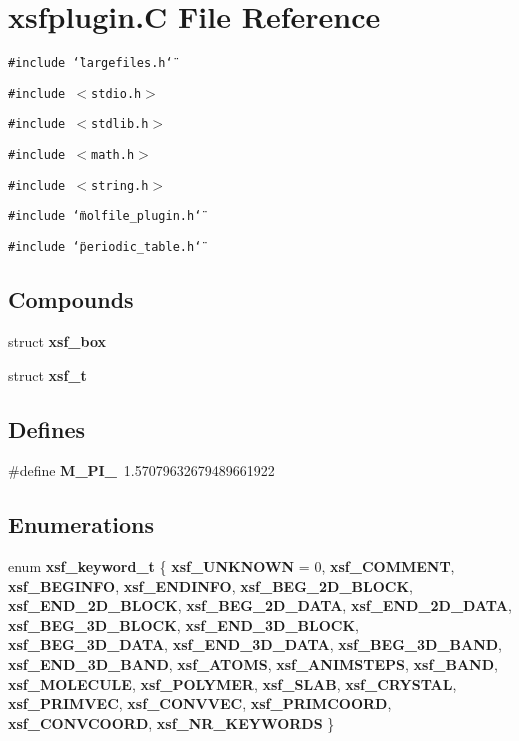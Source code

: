 \section{xsfplugin.C File Reference}
\label{xsfplugin_8C}
{\tt \#include \char`\"{}largefiles.h\char`\"{}}\par
{\tt \#include $<$stdio.h$>$}\par
{\tt \#include $<$stdlib.h$>$}\par
{\tt \#include $<$math.h$>$}\par
{\tt \#include $<$string.h$>$}\par
{\tt \#include \char`\"{}molfile\_\-plugin.h\char`\"{}}\par
{\tt \#include \char`\"{}periodic\_\-table.h\char`\"{}}\par
\subsection*{Compounds}
\begin{CompactItemize}
\item 
struct {\bf xsf\_\-box}
\item 
struct {\bf xsf\_\-t}
\end{CompactItemize}
\subsection*{Defines}
\begin{CompactItemize}
\item 
\#define {\bf M\_\-PI\_}\ 1.57079632679489661922
\end{CompactItemize}
\subsection*{Enumerations}
\begin{CompactItemize}
\item 
enum {\bf xsf\_\-keyword\_\-t} \{ {\bf xsf\_\-UNKNOWN} =  0, 
{\bf xsf\_\-COMMENT}, 
{\bf xsf\_\-BEGINFO}, 
{\bf xsf\_\-ENDINFO}, 
{\bf xsf\_\-BEG\_\-2D\_\-BLOCK}, 
{\bf xsf\_\-END\_\-2D\_\-BLOCK}, 
{\bf xsf\_\-BEG\_\-2D\_\-DATA}, 
{\bf xsf\_\-END\_\-2D\_\-DATA}, 
{\bf xsf\_\-BEG\_\-3D\_\-BLOCK}, 
{\bf xsf\_\-END\_\-3D\_\-BLOCK}, 
{\bf xsf\_\-BEG\_\-3D\_\-DATA}, 
{\bf xsf\_\-END\_\-3D\_\-DATA}, 
{\bf xsf\_\-BEG\_\-3D\_\-BAND}, 
{\bf xsf\_\-END\_\-3D\_\-BAND}, 
{\bf xsf\_\-ATOMS}, 
{\bf xsf\_\-ANIMSTEPS}, 
{\bf xsf\_\-BAND}, 
{\bf xsf\_\-MOLECULE}, 
{\bf xsf\_\-POLYMER}, 
{\bf xsf\_\-SLAB}, 
{\bf xsf\_\-CRYSTAL}, 
{\bf xsf\_\-PRIMVEC}, 
{\bf xsf\_\-CONVVEC}, 
{\bf xsf\_\-PRIMCOORD}, 
{\bf xsf\_\-CONVCOORD}, 
{\bf xsf\_\-NR\_\-KEYWORDS}
 \}
\end{CompactItemize}
